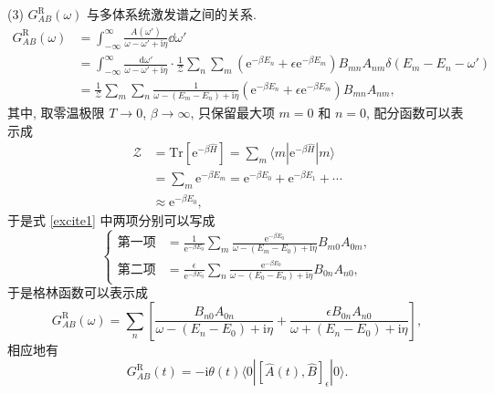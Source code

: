     (3)  $G_{AB}^{\mathrm{R}}(\omega)$ 与多体系统激发谱之间的关系.
    \begin{equation}
        \begin{aligned}
            G_{AB}^{\mathrm{R}}(\omega)&=\int_{-\infty}^{\infty}\frac{A(\omega')}{\omega-\omega'+\mathrm{i}\eta}\dd\omega'\\
            &=\int_{-\infty}^{\infty}\frac{\mathrm{d}\omega'}{\omega-\omega'+\mathrm{i}\eta}\cdot \frac{1}{\mathcal{Z}}\sum_n\sum_m\left( \mathrm{e}^{-\beta E_n}+\epsilon \mathrm{e}^{-\beta E_m} \right) B_{mn}A_{nm} \delta(E_m-E_n-\omega')\\
            &=\frac{1}{\mathcal{Z}}\sum_m\sum_n\frac{1}{\omega-(E_m-E_n)+\mathrm{i}\eta}\left( \mathrm{e}^{-\beta E_n}+\epsilon \mathrm{e}^{-\beta E_m} \right) B_{mn}A_{nm},
        \end{aligned}\label{excite1}
    \end{equation} 
    其中, 取零温极限 $T\to 0$, $\beta\to\infty$, 只保留最大项 $m=0$ 和 $n=0$, 配分函数可以表示成
\begin{align}
            \mathcal{Z}&=\mathrm{Tr}\left[ \mathrm{e}^{-\beta \hat{H}} \right]=\sum_m \langle m|\mathrm{e}^{-\beta\hat H}|m \rangle\nonumber\\
            &=\sum_m\mathrm{e}^{-\beta E_m}=\mathrm{e}^{-\beta E_0}+\mathrm{e}^{-\beta E_1}+\cdots\nonumber\\
            &\approx \mathrm{e}^{-\beta E_0},
        \end{align}
    于是式 \eqref{excite1} 中两项分别可以写成
    \begin{equation}
        \left\{
        \begin{aligned}
            \mbox{第一项}&=\frac{1}{\mathrm{e}^{-\beta E_0}}\sum_m\frac{\mathrm{e}^{-\beta E_0}}{\omega-(E_m-E_0)+\mathrm{i}\eta}B_{m0}A_{0m},\\
            \mbox{第二项}&=\frac{\epsilon}{\mathrm{e}^{-\beta E_0}}\sum_n\frac{\mathrm{e}^{-\beta E_0}}{\omega-(E_0-E_n)+\mathrm{i}\eta}B_{0n}A_{n0},
        \end{aligned}
        \right.
    \end{equation}
    于是格林函数可以表示成
    \begin{equation}
        G_{AB}^{\mathrm{R}}(\omega)=\sum_n\left[ \frac{B_{n0}A_{0n}}{\omega-(E_n-E_0)+\mathrm{i}\eta}+\frac{\epsilon B_{0n}A_{n0}}{\omega+(E_n-E_0)+\mathrm{i}\eta} \right],
    \end{equation}
    相应地有
    \begin{equation}
        G_{AB}^{\mathrm{R}}(t)=-\mathrm{i}\theta(t)\langle 0|[\hat{A}(t),\hat{B}]_\epsilon|0 \rangle.
    \end{equation}
    
